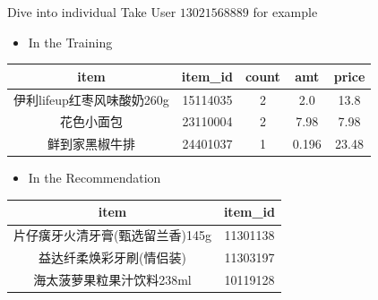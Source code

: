 \documentclass{beamer}
\begin{document}
  \begin{frame}{Dive into individual}
    Take User $13021568889$ for example
    \begin{itemize}
      \item In the Training
    \end{itemize}
    \centering\begin{tabular}{c | c | c | c | c}
      item & item\_id & count & amt & price\\
      \hline
      伊利lifeup红枣风味酸奶260g & 15114035 & 2 & 2.0 & 13.8\\
      花色小面包 & 23110004 & 2 & 7.98 & 7.98\\
      鲜到家黑椒牛排 & 24401037 & 1 & 0.196 & 23.48\\
    \end{tabular}
    \begin{itemize}
      \item In the Recommendation
    \end{itemize}
    \centering\begin{tabular}{c | c }
    item & item\_id\\
    \hline
    片仔癀牙火清牙膏(甄选留兰香)145g & 11301138\\
    益达纤柔焕彩牙刷(情侣装) & 11303197\\
    海太菠萝果粒果汁饮料238ml & 10119128\\
    \end{tabular}
  \end{frame}
  
\end{document}
